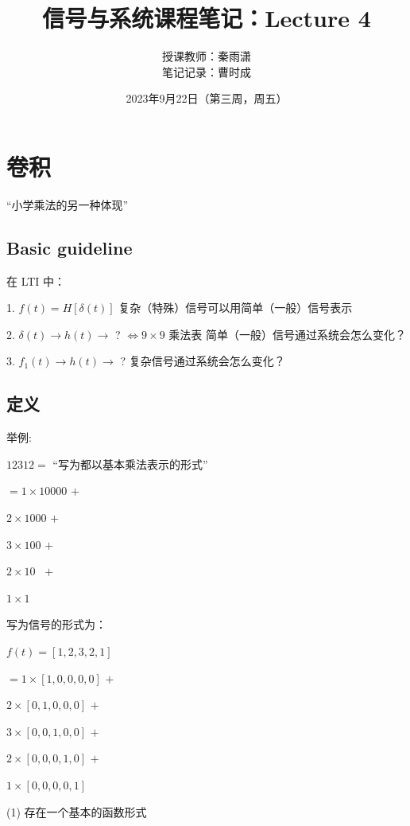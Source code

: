 \documentclass[UTF8]{ctexart}
\title{信号与系统课程笔记：Lecture 4}
\author{授课教师：秦雨潇 \\
笔记记录：曹时成}
\date{2023年9月22日（第三周，周五）}
\begin{document}
\maketitle

\section{卷积}
“小学乘法的另一种体现”
\subsection{Basic guideline}
在 LTI 中： \par
1. $f(t)=H [ \delta (t)]  $ \qquad  \qquad \qquad \qquad  \quad 复杂（特殊）信号可以用简单（一般）信号表示 \par
2. $\delta (t)\to h(t)\to $ ? $ \Leftrightarrow 9\times 9 $ 乘法表  \quad 简单（一般）信号通过系统会怎么变化？ \par
3. $f_1(t)\to h(t)\to $ ? \qquad  \qquad \qquad \qquad   复杂信号通过系统会怎么变化？\par
\subsection{定义}
举例:\par
$12312=$ “写为都以基本乘法表示的形式” \par
\qquad  \quad  $= 1\times 10000 $ \; $+$\par
\qquad \qquad  $2\times 1000 $  \quad  $+$\par
\qquad \qquad  $3\times 100 $ \quad \; $+$\par
\qquad \qquad  $2\times 10 $ \quad \; \, $+$\par
\qquad \qquad  $1\times 1 $ \par
写为信号的形式为：\par
$f(t)=[ 1,2,3,2,1]  $ \par
\qquad $=1\times [ 1,0,0,0,0]  $  $+$\par
\qquad \quad $ 2\times [ 0,1,0,0,0]  $  $+$\par
\qquad \quad $ 3\times [ 0,0,1,0,0]  $  $+$\par
\qquad \quad $ 2\times [ 0,0,0,1,0]  $  $+$\par
\qquad \quad $ 1\times [ 0,0,0,0,1]  $  \par

(1) \; 存在一个基本的函数形式 \par
\end{document}
